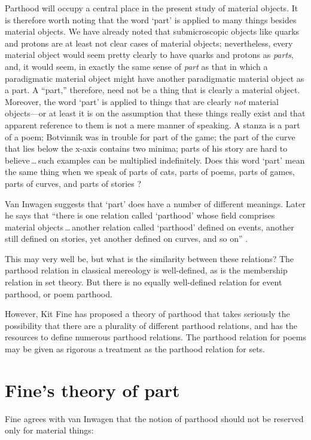 \documentclass[11pt]{article}
\newenvironment{squote}{%
\begin{spacing}{1}
\begin{list}{}{%
\setlength{\labelwidth}{0pt}%
\rightmargin\leftmargin%
}
\item\relax
}{%
\end{list}%
\end{spacing}
}
\begin{document}
\begin{spacing}{1.5}
\begin{squote}
Parthood will occupy a central place in the present study of material
objects.  It is therefore worth noting that the word `part' is applied
to many things besides material objects.  We have already noted that
submicroscopic objects like quarks and protons are at least not clear
cases of material objects; nevertheless, every material object would
seem pretty clearly to have quarks and protons as \emph{parts}, and,
it would seem, in exactly the same sense of \emph{part} as that in
which a paradigmatic material object might have another paradigmatic
material object as a part.  A ``part,'' therefore, need not be a thing
that is clearly a material object.  Moreover, the word `part' is
applied to things that are clearly \emph{not} material objects---or at
least it is on the assumption that these things really exist and that
apparent reference to them is not a mere manner of speaking.  A stanza
is a part of a poem; Botvinnik was in trouble for part of the game;
the part of the curve that lies below the x-axis contains two minima;
parts of his story are hard to believe\,\ldots\,such examples can be
multiplied indefinitely.  Does this word `part' mean the same thing
when we speak of parts of cats, parts of poems, parts of games, parts
of curves, and parts of stories \citeyearpar[18--19]{inwagen1995}?
\end{squote} 

Van Inwagen suggests that `part' does have a number of different
meanings.  Later he says that ``there is one relation called
`parthood' whose field comprises material objects\,\ldots\,another
relation called `parthood' defined on events, another still defined on
stories, yet another defined on curves, and so on''
\citeyearpar[19]{inwagen1995}.

This may very well be, but what is the similarity between these
relations?  The parthood relation in classical mereology is
well-defined, as is the membership relation in set theory.  But there
is no equally well-defined relation for event parthood, or poem parthood.

However, Kit Fine has proposed a theory of parthood that takes
seriously the possibility that there are a plurality of different
parthood relations, and has the resources to define numerous parthood
relations.  The parthood relation for poems may be given as rigorous a
treatment as the parthood relation for sets.

\section{Fine's theory of part}
\label{fine}
Fine agrees with van Inwagen that the notion of parthood should not be
reserved only for material things:


\end{spacing}
\end{document}
